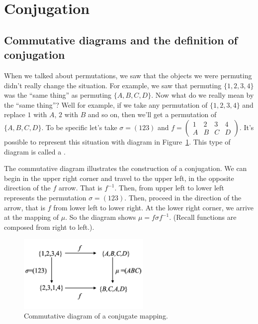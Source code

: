 \section{Conjugation}\label {Conjugation}
\subsection*{Commutative diagrams and the definition of conjugation}
When we talked about permutations, we saw that the objects we were permuting didn't really change the situation.  For example, we saw that permuting $\{1,2,3,4\}$ was the ``same thing'' as permuting $\{A,B,C,D\}$. Now what do we really mean by the ``same thing''? Well for example, if we take any permutation of $\{1,2,3,4\}$ and replace $1$ with $A$, $2$ with $B$ and so on, then we'll get a permutation of $\{A,B,C,D\}$. To be specific let's take $\sigma=(123)$ and $f=\begin {pmatrix} 1&2&3&4\\A&B&C&D\end {pmatrix}$.  It's possible to represent this situation with diagram in Figure~\ref{fig:Commutative1}. This type of diagram is called a .


The commutative diagram illustrates the construction of a conjugation. We can begin in the upper right corner and travel to the upper left, in the opposite direction of the $f$ arrow. That is $f^{-1}$.  Then, from upper left to lower left represents the permutation $\sigma=(123)$.  Then, proceed in the direction of the arrow, that is $f$ from lower left to lower right.  At the lower right corner, we arrive at the mapping of $\mu$.  So the diagram shows $\mu=f\sigma f^{-1}$.  (Recall functions are composed from right to left.).  

\begin{figure}[ht]
\begin{center}
\includegraphics[width=2.5in]{images/Commutative1.png}
\caption{Commutative diagram of a conjugate mapping.}\label{fig:Commutative1}
\end{center}
\end{figure}

